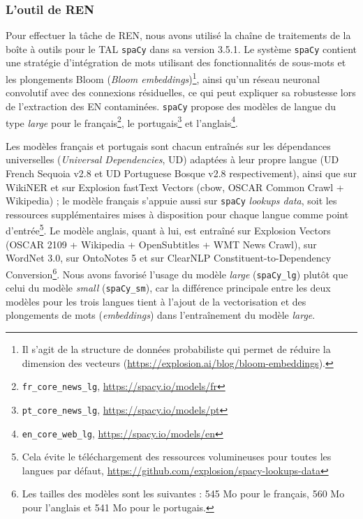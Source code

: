 \subsubsection{L'outil de REN}
\label{subsubsec:spacy_REN}
Pour effectuer la tâche de REN,
nous avons utilisé la chaîne de traitements de la boîte à outils pour le TAL \texttt{spaCy} dans sa version 3.5.1. %
Le système \texttt{spaCy} contient une stratégie d'intégration de mots utilisant des fonctionnalités de sous-mots et les plongements \og{}Bloom\fg{} (\textit{Bloom embeddings})\footnote{Il s'agit de la structure de données probabiliste qui permet de réduire la dimension des vecteurs (\url{https://explosion.ai/blog/bloom-embeddings}).}, ainsi qu'un réseau neuronal convolutif avec des connexions résiduelles, ce qui peut expliquer sa robustesse lors de l'extraction des EN contaminées. \texttt{spaCy} propose des modèles de langue du type \textit{large} pour le français\footnote{\texttt{fr\_core\_news\_lg}, \url{https://spacy.io/models/fr}}, le portugais\footnote{\texttt{pt\_core\_news\_lg}, \url{https://spacy.io/models/pt}} et l'anglais\footnote{\texttt{en\_core\_web\_lg}, \url{https://spacy.io/models/en}}. 

Les modèles français et portugais sont chacun entraînés sur les dépendances universelles (\textit{Universal Dependencies}, UD) adaptées à leur propre langue (UD French Sequoia v2.8 et UD Portuguese Bosque v2.8 respectivement), ainsi que sur WikiNER et sur Explosion fastText Vectors (cbow, OSCAR Common Crawl + Wikipedia) ; le modèle français s'appuie aussi sur \texttt{spaCy} \textit{lookups data}, soit les ressources supplémentaires mises à disposition pour chaque langue comme point d’entrée\footnote{Cela évite le téléchargement des ressources volumineuses pour toutes les langues par défaut, \url{https://github.com/explosion/spacy-lookups-data}}. Le modèle anglais, quant à lui, est entraîné sur Explosion Vectors (OSCAR 2109 + Wikipedia + OpenSubtitles + WMT News Crawl), sur WordNet 3.0, sur OntoNotes 5 et sur ClearNLP Constituent-to-Dependency Conversion\footnote{Les tailles des modèles sont les suivantes : 545 Mo pour le français, 560 Mo pour l'anglais et 541 Mo pour le portugais.}. Nous avons favorisé l'usage du modèle \textit{large} (\texttt{spaCy\_lg}) plutôt que celui du modèle \textit{small} (\texttt{spaCy\_sm}), car la différence principale entre les deux modèles pour les trois langues tient à l'ajout de la vectorisation et des plongements de mots (\textit{embeddings}) dans l'entraînement du modèle \textit{large}.



